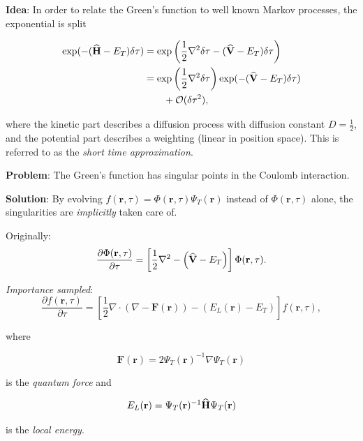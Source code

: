 \begin{frame}
 \textbf{Idea}: In order to relate the Green's function to well known Markov processes, the exponential is split
 
 \begin{align*}
  \exp(-({\bf\widehat{H}} - E_T)\delta\tau) &= \exp\left(\frac{1}{2}\nabla^2\delta\tau - ({\bf\widehat{V}} - E_T)\delta\tau\right)\\
     &= \exp\left(\frac{1}{2}\nabla^2\delta\tau\right)\exp( - ({\bf\widehat{V}} - E_T)\delta\tau) \\
     & \qquad  + \mathcal{O}(\delta\tau^2),
 \end{align*}
 
 where the kinetic part describes a diffusion process with diffusion constant $D=\frac{1}{2}$, and the potential part describes a weighting (linear in position space). This is referred to as the \textit{short time approximation}.

 
\end{frame}

\begin{frame}
 \textbf{Problem}: The Green's function has singular points in the Coulomb interaction.
 \shift
 
 \textbf{Solution}: By evolving $f(\mathbf{r}, \tau) = \Phi(\mathbf{r}, \tau)\Psi_T(\mathbf{r})$ instead of $\Phi(\mathbf{r}, \tau)$ alone, the singularities are \emph{implicitly} taken care of.
  
 \end{frame}

 \begin{frame}
   Originally:
 \begin{equation*}
  \frac{\partial \Phi(\mathbf{r}, \tau)}{\partial\tau} = \left[\frac{1}{2}\nabla^2 - \left({\bf\widehat{V}} - E_T\right)\right]\Phi(\mathbf{r}, \tau).
 \end{equation*}
 
 \pause
 
 \textit{Importance sampled}:
  \begin{equation}
  \frac{\partial f(\mathbf{r}, \tau)}{\partial\tau} = \left[\frac{1}{2}\nabla\cdot\left(\nabla - \mathbf{F}(\mathbf{r})\right) - (E_L(\mathbf{r}) - E_T)\right]f(\mathbf{r}, \tau),
 \end{equation}
 
 where
 
\begin{equation}
  \mathbf{F}(\mathbf{r}) =  2\Psi_T(\mathbf{r})^{-1}\nabla \Psi_T(\mathbf{r})
\end{equation}

is the \textit{quantum force} and 

\begin{equation} 
E_L(\mathbf{r}) = \Psi_T(\mathbf{r})^{-1}{\bf\widehat{H}}\Psi_T(\mathbf{r})
\end{equation}

is the \textit{local energy}. 

\end{frame}

